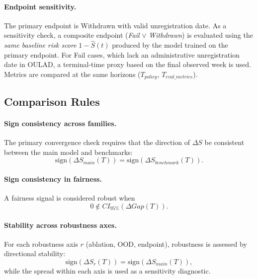 \paragraph*{Endpoint sensitivity.}
The primary endpoint is Withdrawn with valid unregistration date. As a sensitivity check, a composite endpoint (\textit{Fail} $\lor$ \textit{Withdrawn}) is evaluated using the \emph{same baseline risk score} $1-\hat S(t)$ produced by the model trained on the primary endpoint. For Fail cases, which lack an administrative unregistration date in OULAD, a terminal-time proxy based on the final observed week is used. Metrics are compared at the same horizons ($T_{policy}$, $T_{eval\_metrics}$).

\subsection{Comparison Rules}
\label{subsec:reading_criteria}



\paragraph*{Sign consistency across families.}
The primary convergence check requires that the direction of $\Delta S$ be consistent between the main model and benchmarks:
\begin{equation*}
\mathrm{sign}\!\left(\Delta S_{main}(T)\right)
= \mathrm{sign}\!\left(\Delta S_{benchmark}(T)\right).
\end{equation*}


\paragraph*{Sign consistency in fairness.}
A fairness signal is considered robust when
\begin{equation*}
0 \notin CI_{95\%}\!\left(\Delta Gap(T)\right).
\end{equation*}


\paragraph*{Stability across robustness axes.}
For each robustness axis $r$ (ablation, OOD, endpoint), robustness is assessed by directional stability:
\begin{equation*}
\mathrm{sign}\!\left(\Delta S_r(T)\right)
= \mathrm{sign}\!\left(\Delta S_{main}(T)\right),
\end{equation*}
while the spread within each axis is used as a sensitivity diagnostic.

